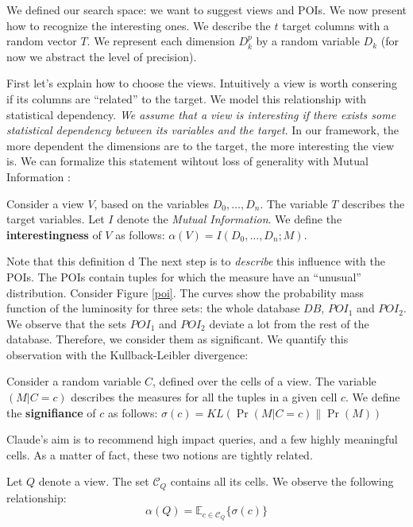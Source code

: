 We defined our search space: we want to suggest views and POIs. We now present
how to recognize the interesting ones. We describe the $t$ target columns with
a random vector $T$.  We represent each  dimension $D_k^p$ by a random
variable $D_k$ (for now we abstract the level of precision).

First let's explain how to choose the views.  Intuitively a view is worth
consering if its columns are ``related'' to the target.  We model this
relationship with statistical dependency. \emph{We assume that a view is
interesting if there exists some statistical dependency between its variables
and the target}. In our framework, the more dependent the dimensions are to the
target, the more interesting the view is. We can formalize this statement 
wihtout loss of generality with Mutual Information \cite{cover2012elements}:

\begin{definition}
Consider a view $V$, based on the variables $D_0, \ldots, D_n$. The variable
$T$ describes the target variables.  Let $I$ denote the \emph{Mutual
Information}. We define the \textbf{interestingness} of $V$ as follows: $\alpha(V) =
I(D_0, \ldots, D_n ; M)$.
\end{definition}

Note that this definition d
The next step is to \emph{describe} this influence with the POIs. The POIs
contain tuples for which the measure have an ``unusual'' distribution.
Consider Figure \ref{poi}. The curves show the probability mass function of the
luminosity for three sets: the whole database $DB$, $POI_1$ and $POI_2$. We
observe that the sets $POI_1$ and $POI_2$ deviate a lot from the rest of the
database.  Therefore, we consider them as significant. We quantify this
observation with the Kullback-Leibler divergence:

\begin{definition}
Consider a random variable $C$, defined over the cells of a view.  The variable $(M |
C=c)$ describes the measures for all the tuples in a given cell $c$.  We define the
\textbf{signifiance} of $c$ as follows: $\sigma(c) = KL( \Pr(M | C=c) \|
\Pr(M)  )$
\end{definition}

Claude's aim is to recommend high impact queries, and a few highly meaningful
cells. As a matter of fact, these two notions are tightly related.

\begin{lemma}
Let $Q$ denote a view. The set $\mathcal{C}_Q$ contains all its cells. We
observe the following relationship:
\[
    \alpha(Q) = \mathbb{E}_{c \in \mathcal{C}_Q} \{ \sigma(c) \}
\]
\end{lemma}

